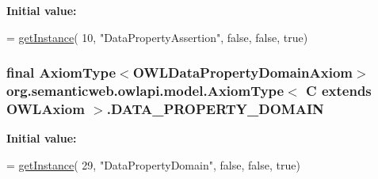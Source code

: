 {\bfseries Initial value\-:}
\begin{DoxyCode}
= \hyperlink{classorg_1_1semanticweb_1_1owlapi_1_1model_1_1_axiom_type_3_01_c_01extends_01_o_w_l_axiom_01_4_a485e011845434c518471707a87f09339}{getInstance}(
            10, \textcolor{stringliteral}{"DataPropertyAssertion"}, \textcolor{keyword}{false}, \textcolor{keyword}{false}, \textcolor{keyword}{true})
\end{DoxyCode}
\hypertarget{classorg_1_1semanticweb_1_1owlapi_1_1model_1_1_axiom_type_3_01_c_01extends_01_o_w_l_axiom_01_4_aeabdb857b3cc3a41646345b5aea2808e}{
\subsubsection[{D\-A\-T\-A\-\_\-\-P\-R\-O\-P\-E\-R\-T\-Y\-\_\-\-D\-O\-M\-A\-I\-N}]{\setlength{\rightskip}{0pt plus 5cm}final {\bf Axiom\-Type}$<${\bf O\-W\-L\-Data\-Property\-Domain\-Axiom}$>$ org.\-semanticweb.\-owlapi.\-model.\-Axiom\-Type$<$ C extends {\bf O\-W\-L\-Axiom} $>$.D\-A\-T\-A\-\_\-\-P\-R\-O\-P\-E\-R\-T\-Y\-\_\-\-D\-O\-M\-A\-I\-N\hspace{0.3cm}{\ttfamily [static]}}}\label{classorg_1_1semanticweb_1_1owlapi_1_1model_1_1_axiom_type_3_01_c_01extends_01_o_w_l_axiom_01_4_aeabdb857b3cc3a41646345b5aea2808e}
{\bfseries Initial value\-:}
\begin{DoxyCode}
= \hyperlink{classorg_1_1semanticweb_1_1owlapi_1_1model_1_1_axiom_type_3_01_c_01extends_01_o_w_l_axiom_01_4_a485e011845434c518471707a87f09339}{getInstance}(
            29, \textcolor{stringliteral}{"DataPropertyDomain"}, \textcolor{keyword}{false}, \textcolor{keyword}{false}, \textcolor{keyword}{true})
\end{DoxyCode}
